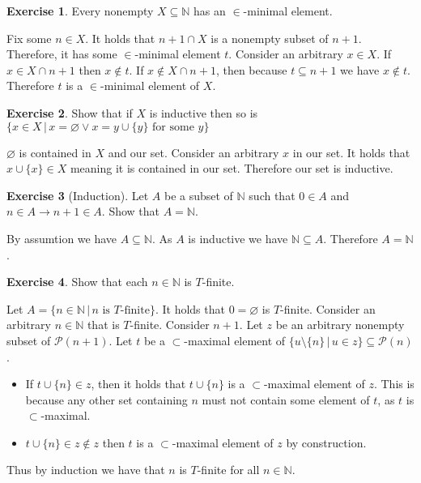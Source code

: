 \documentclass{article}
\theoremstyle{definition}
\newtheorem{exer}{Exercise}[section]
\newcommand{\powset}[1]{\mathcal{P}(#1)}
\newcommand{\N}{\mathbb{N}}
\newcommand*{\mtset}{\ensuremath{\varnothing}}
\newlength{\defparindent}
\newenvironment{answer}
    {\begin{mdframed}[backgroundcolor=gray!15, linewidth=0pt] \setlength{\parindent}{\defparindent}}
    {\end{mdframed}}
\begin{document}
\begin{exer}
    Every nonempty $X \subseteq \N$ has an $\in$-minimal element. 

    \begin{answer}
        Fix some $n \in X$. It holds that $n + 1 \cap X$ is a nonempty subset of $n + 1$. Therefore, it has some $\in$-minimal element $t$. Consider an arbitrary $x \in X$. If $x \in X \cap n + 1$ then $x \not\in t$. If $x \not\in X \cap n + 1$, then because $t \subseteq n + 1$ we have $x \not\in t$. Therefore $t$ is a $\in$-minimal element of $X$.
    \end{answer}
\end{exer}

\begin{exer}
    Show that if $X$ is inductive then so is $\{x \in X \, | \, x = \mtset \lor x = y \cup \{y\} \text{ for some $y$} \}$

    \begin{answer}
        $\mtset$ is contained in $X$ and our set. Consider an arbitrary $x$ in our set. It holds that $x \cup \{x\} \in X$ meaning it is contained in our set. Therefore our set is inductive. 
    \end{answer}
\end{exer}

\begin{exer}[Induction]
    Let $A$ be a subset of $\N$ such that $0 \in A$ and $n \in A \to n + 1 \in A$. Show that $A = \N$.
    \begin{answer}
        By assumtion we have $A \subseteq \N$. As $A$ is inductive we have $\N \subseteq A$. Therefore $A = \N$.
    \end{answer}
\end{exer}

\begin{exer}
    Show that each $n \in \N$ is $T$-finite. 
    \begin{answer}
        Let $A = \{n \in \N \, | \, n \text{ is $T$-finite}\}$. It holds that $0=\mtset$ is $T$-finite. Consider an arbitrary $n \in \N$ that is $T$-finite. Consider $n + 1$. Let $z$ be an arbitrary nonempty subset of $\powset{n + 1}$. Let $t$ be a $\subset$-maximal element of $\{u \setminus \{n\} \, | \, u \in z\} \subseteq \powset{n}$.
        \begin{itemize}
            \item If $t \cup \{n\} \in z$, then it holds that $t \cup \{n\}$ is a $\subset$-maximal element of $z$. This is because any other set containing $n$ must not contain some element of $t$, as $t$ is $\subset$-maximal.
            \item $t \cup \{n\} \in z \not\in z$ then $t$ is a $\subset$-maximal element of $z$ by construction.
        \end{itemize}
        Thus by induction we have that $n$ is $T$-finite for all $n \in \N$. 
    \end{answer}
\end{exer}
\end{document}
